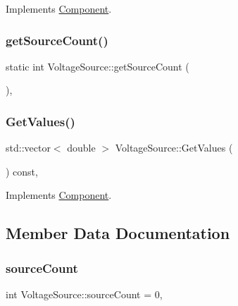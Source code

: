 Implements \hyperlink{classComponent_a833d40a0f50c3c06dcab2e035b758e6f}{Component}.

\mbox{\label{classVoltageSource_a0b37bef66decef2d9d0268a1f732a78e}} 
\subsubsection{\texorpdfstring{get\+Source\+Count()}{getSourceCount()}}
{\footnotesize\ttfamily static int Voltage\+Source\+::get\+Source\+Count (\begin{DoxyParamCaption}{ }\end{DoxyParamCaption})\hspace{0.3cm}{\ttfamily [inline]}, {\ttfamily [static]}}

\mbox{\label{classVoltageSource_a60bb1c5c07f668854a817d626f220f84}} 
\subsubsection{\texorpdfstring{Get\+Values()}{GetValues()}}
{\footnotesize\ttfamily std\+::vector$<$ double $>$ Voltage\+Source\+::\+Get\+Values (\begin{DoxyParamCaption}{ }\end{DoxyParamCaption}) const\hspace{0.3cm}{\ttfamily [override]}, {\ttfamily [virtual]}}



Implements \hyperlink{classComponent_a7c6ba16177143bc9945583a9c3df4c89}{Component}.



\subsection{Member Data Documentation}
\mbox{\label{classVoltageSource_ade16a2431763eeff86ec7a4f842cf6f0}} 
\subsubsection{\texorpdfstring{source\+Count}{sourceCount}}
{\footnotesize\ttfamily int Voltage\+Source\+::source\+Count = 0\hspace{0.3cm}{\ttfamily [static]}, {\ttfamily [private]}}

